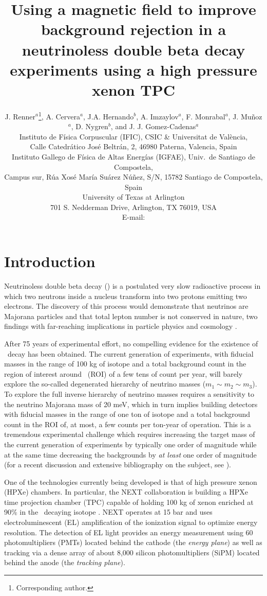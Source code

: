 \documentclass{JINST}
\title{Using a magnetic field to improve background rejection in a neutrinoless double beta decay experiments using a high pressure xenon TPC}
\author{J. Renner$^a$\thanks{Corresponding author.},
A. Cervera$^a$, J.A. Hernando$^b$, A. Imzaylov$^a$, F. Monrabal$^a$, J. Mu\~noz$^a$, D. Nygren$^b$, and J. J. Gomez-Cadenas$^a$\\
\llap{$^a$}Instituto de F\'isica Corpuscular (IFIC), CSIC \& Universitat de Val\`encia,\\ 
Calle Catedr\'atico Jos\'e Beltr\'an, 2, 46980 Paterna, Valencia, Spain\\
\llap{$^b$}Instituto Gallego de F\'isica de Altas Energ\'ias (IGFAE), Univ.\ de Santiago de Compostela,\\ Campus sur, R\'ua Xos\'e Mar\'ia Su\'arez N\'u\~nez, S/N, 15782 Santiago de Compostela, Spain\\
\llap{$^c$}University of Texas at Arlington\\
 701 S. Nedderman Drive, Arlington, TX 76019, USA\\
E-mail: \email{jrenner@ific.uv.es}}
\begin{document}
\section{Introduction}\label{sec:intro}

Neutrinoless double beta decay (\bbonu) is a postulated very slow radioactive process in which two neutrons inside a nucleus transform into two protons emitting two electrons. The discovery of this process would demonstrate that neutrinos are Majorana particles and that total lepton number is not conserved in nature, two findings with far-reaching implications in particle physics and cosmology \cite{GomezCadenas:2013ue, Cadenas_2012}.

After 75 years of experimental effort, no compelling evidence for the existence of \bbonu\ decay has been obtained. The current generation of experiments, with fiducial masses in the range of 100 kg of isotope and a total background count in the region of interest around \Qbb\ (ROI) of a few tens of count per year, will barely explore the so-called degenerated hierarchy of neutrino masses ($m_1 \sim m_2 \sim m_3$). To explore the full inverse hierarchy of neutrino masses requires a sensitivity to the neutrino Majorana mass of 20 meV, which in turn implies building detectors with fiducial masses in the range of one ton of isotope and a total background count in the ROI of, at most, a few counts per ton-year of operation. This is a tremendous experimental challenge which requires increasing the target mass of the current generation of experiments by typically one order of magnitude while at the same time decreasing the backgrounds by {\em at least} one order of magnitude (for a recent discussion and extensive bibliography on the subject, see \cite{Gomez-Cadenas:2015twa}).

One of the technologies currently being developed is that of high pressure xenon (HPXe) chambers. In particular, the NEXT collaboration \cite{Gomez-Cadenas:2014dxa} is building a HPXe time projection chamber (TPC) capable of holding 100 kg of xenon enriched at 90\% in the \bb\ decaying isotope \XE. NEXT operates at 15 bar and uses electroluminescent (EL) amplification of the ionization signal to optimize energy resolution. The detection of EL light provides an energy measurement using 60 photomultipliers (PMTs) located behind the cathode (the \emph{energy plane}) as well as tracking  via a dense array of about 8,000 silicon photomultipliers (SiPM) located behind the anode (the \emph{tracking plane}).
\end{document}
